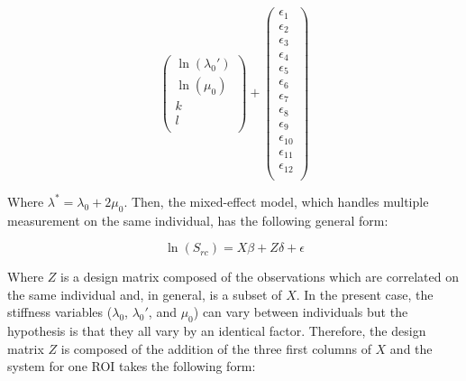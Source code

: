 \documentclass[a4paper,fleqn]{DC_ArtStyle}
\begin{document}
\begin{equation}
\begin{pmatrix}
		\ln(\lambda_0') \\
		\ln(\mu_0) \\
		k \\
		l \\
	\end{pmatrix} + \begin{pmatrix}
		\epsilon_{1} \\
		\epsilon_{2} \\
		\epsilon_{3} \\
		\epsilon_{4} \\
		\epsilon_{5} \\
		\epsilon_{6} \\
		\epsilon_{7} \\
		\epsilon_{8} \\
		\epsilon_{9} \\
		\epsilon_{10} \\
		\epsilon_{11} \\
		\epsilon_{12} \\
	\end{pmatrix}
\end{equation}

Where $\lambda^{*} = \lambda_0 + 2\mu_0$. Then, the mixed-effect model, which handles multiple measurement on the same individual, has the following general form:

\begin{equation}
	\ln(S_{rc}) = X \beta + Z \delta + \epsilon
\end{equation}

Where $Z$ is a design matrix composed of the observations which are correlated on the same individual and, in general, is a subset of $X$. In the present case, the stiffness variables ($\lambda_0$, $\lambda_0'$, and $\mu_0$) can vary between individuals but the hypothesis is that they all vary by an identical factor. Therefore, the design matrix $Z$ is composed of the addition of the three first columns of $X$ and the system for one ROI takes the following form:\\
\end{document}
